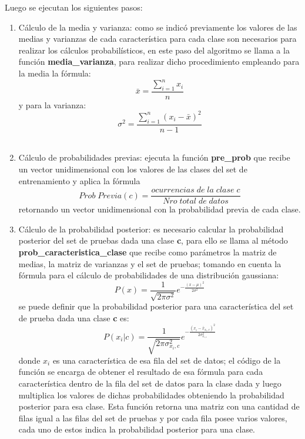 Luego se ejecutan los siguientes pasos:
\begin{enumerate}
	\item Cálculo de la media y varianza:
	como se indicó previamente los valores de las medias y varianzas de cada característica para cada clase son necesarios
	para realizar los cálculos probabilísticos, en este paso del algoritmo se llama a la función \textbf{media\_varianza}, para
	realizar dicho procedimiento empleando para la media la fórmula: \[\bar{x}=\frac{\sum_{i=1}^n{x_{i}}}{n}\] y para la varianza:
	\[\sigma^2=\frac{\sum_{i=1}^n{\left(x_{i}-\bar{x}\right)^2}}{n - 1}\]\\
	\item Cálculo de probabilidades previas:
	ejecuta la función \textbf{pre\_prob} que recibe un vector unidimensional con los valores de las clases
	del set de entrenamiento y aplica la fórmula
	\[Prob\;Previa\left(c\right)=\frac{ocurrencias\;de\;la\;clase\;c}{Nro\;total\;de\;datos}\]
	retornando un vector unidimensional con la probabilidad previa de cada clase.\\
	\item Cálculo de la probabilidad posterior:
	es necesario calcular la probabilidad posterior del set de pruebas dada una clase \textbf{c},
	para ello se llama al método \textbf{prob\_caracteristica\_clase} que recibe como
	parámetros la matriz de medias, la matriz de varianzas y el set de pruebas; tomando en cuenta la
	fórmula para el cálculo de probabilidades de una distribución gaussiana:
	\[
	P\left(x\right) = \frac{1}{\sqrt{2\pi\sigma^{2}}}e^{-\frac{\left(x-\mu\right)^{2}}{2\sigma^{2}}}
	\]
	se puede definir que la probabilidad posterior para una característica del set de prueba dada una
	clase \textbf{c} es:
	\[
	P\left(x_{i}|c\right) = \frac{1}{\sqrt{2\pi\sigma^{2}_{x_{i},c}}}
	e^{-\frac{\left(x_{i}-\bar{x}_{x_{i},c}\right)^{2}}{2\sigma^{2}_{x_{i,c}}}}
	\]
	donde $x_{i}$ es una característica de esa fila del set de datos; el código de la función se encarga de
	obtener el resultado de esa fórmula para cada característica dentro de la fila del set de datos para
	la clase dada y luego multiplica los valores de dichas probabilidades obteniendo la probabilidad posterior
	para esa clase. Esta función retorna una matriz con una cantidad de filas igual a las filas del set de
	pruebas y por cada fila posee varios valores, cada uno de estos indica la probabilidad posterior para una clase.\\


\end{enumerate}
